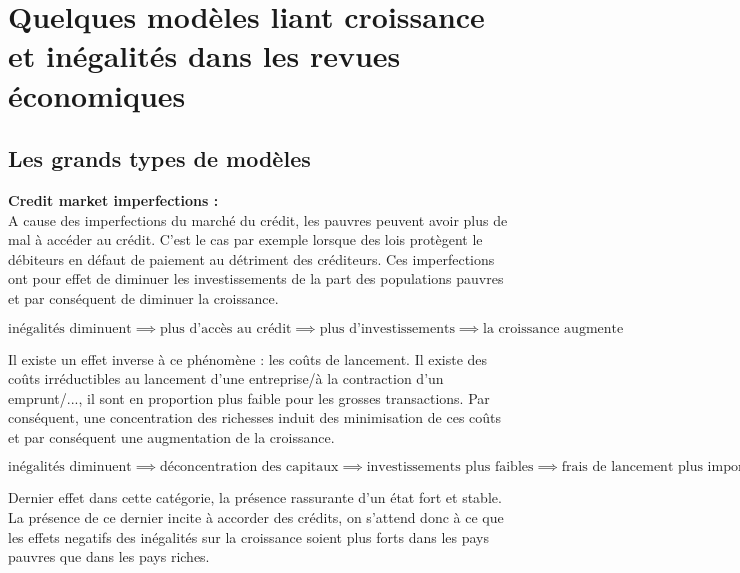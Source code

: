 \documentclass[11pt,a4paper]{article}
\begin{document}
\setlength{\parindent}{0pt}


\tableofcontents

\setcounter{page}{1}

\setlength{\parindent}{16pt}

\section{Quelques modèles liant croissance et inégalités dans les revues économiques}
\subsection{Les grands types de modèles}
\noindent
\textbf{Credit market imperfections :}\\
A cause des imperfections du marché du crédit, les pauvres peuvent avoir plus de mal à accéder au crédit. C'est le cas par exemple lorsque des lois protègent le débiteurs en défaut de paiement au détriment des créditeurs. Ces imperfections ont pour effet de diminuer les investissements de  la part des populations pauvres et par conséquent de diminuer la croissance. 

\begin{dmath}
\text{inégalités diminuent} \implies \text{plus d'accès au crédit} \implies \text{plus d'investissements} \implies \text{la croissance augmente}
\end{dmath}

Il existe un effet inverse à ce phénomène : les coûts de lancement. Il existe des coûts irréductibles au lancement d'une entreprise/à la contraction d'un emprunt/..., il sont en proportion plus faible pour les grosses transactions. Par conséquent, une concentration des richesses induit des minimisation de ces coûts et par conséquent une augmentation de la croissance. 

\begin{dmath}
\text{inégalités diminuent} \implies \text{déconcentration des capitaux} \implies \text{investissements plus faibles} \implies \text{frais de lancement plus important} \implies \text{la croissance diminue}
\end{dmath}

Dernier effet dans cette catégorie, la présence rassurante d'un état fort et stable. La présence de ce dernier incite à accorder des crédits, on s'attend donc à ce que les effets negatifs des inégalités sur la croissance soient plus forts dans les pays pauvres que dans les pays riches. \\
\end{document}
